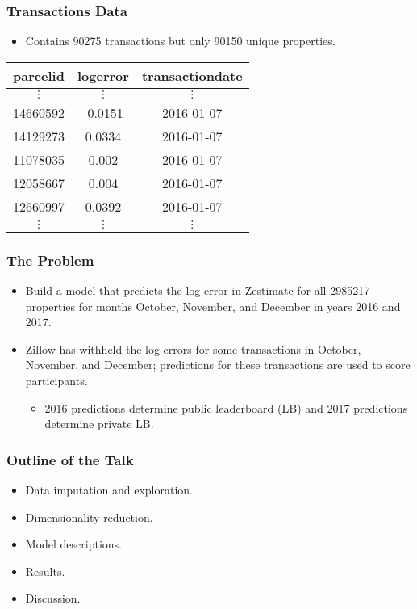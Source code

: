 \documentclass{beamer}
\begin{document}
\begin{frame}
\frametitle{Transactions Data}
\begin{itemize}
\item Contains 90275 transactions but only 90150 unique properties.
\end{itemize}
\begin{center}
\begin{tabular}{|c|c|c|} \hline
parcelid & logerror & transactiondate \\ \hline
$\vdots$ & $\vdots$ & $\vdots$ \\
14660592 & -0.0151 & 2016-01-07 \\
14129273 & 0.0334 & 2016-01-07 \\
11078035 & 0.002 & 2016-01-07 \\
12058667 & 0.004 & 2016-01-07 \\
12660997 & 0.0392 & 2016-01-07 \\
$\vdots$ & $\vdots$ & $\vdots$ \\
\hline
\end{tabular}
\end{center}
\end{frame}

\begin{frame}
\frametitle{The Problem}
\begin{itemize}
\item Build a model that predicts the log-error in Zestimate for all 2985217 properties for months October, November, and December in years 2016 and 2017.
\item Zillow has withheld the log-errors for some transactions in October, November, and December; predictions for these transactions are used to score participants.
\begin{itemize}
\item 2016 predictions determine public leaderboard (LB) and 2017 predictions determine private LB.
\end{itemize}
\end{itemize}
\end{frame}

\begin{frame}
\frametitle{Outline of the Talk}
\begin{itemize}
\item Data imputation and exploration.
\item Dimensionality reduction.
\item Model descriptions.
\item Results.
\item Discussion.
\end{itemize}
\end{frame}
\end{document}
